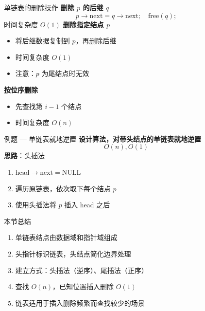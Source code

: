\documentclass[10pt, aspectratio=169]{beamer}
\begin{document}
\begin{frame}{单链表的删除操作}
    \textbf{删除 $p$ 的后继 $q$}
    \[
    p \to \text{next} = q \to \text{next};\quad \text{free}(q);
    \]
    时间复杂度 $O(1)$
    \vspace{0.5em}
    \textbf{删除指定结点 $p$}
    \begin{itemize}
        \item 将后继数据复制到 $p$，再删除后继
        \item 时间复杂度 $O(1)$
        \item 注意：$p$ 为尾结点时无效
    \end{itemize}
    \vspace{0.5em}
    \textbf{按位序删除}
    \begin{itemize}
        \item 先查找第 $i-1$ 个结点
        \item 时间复杂度 $O(n)$
    \end{itemize}
\end{frame}

\begin{frame}{例题 --- 单链表就地逆置}
    \textbf{设计算法，对带头结点的单链表就地逆置}
    \[
    O(n), O(1)
    \]
    \vspace{0.3em}
    \textbf{思路}：头插法
    \begin{enumerate}
        \item $\text{head} \to \text{next} = \text{NULL}$
        \item 遍历原链表，依次取下每个结点 $p$
        \item 使用头插法将 $p$ 插入 head 之后
    \end{enumerate}
\end{frame}

\begin{frame}{本节总结}
    \begin{enumerate}
        \item 单链表结点由数据域和指针域组成
        \item 头指针标识链表，头结点简化边界处理
        \item 建立方式：头插法（逆序）、尾插法（正序）
        \item 查找 $O(n)$，已知位置插入删除 $O(1)$
        \item 链表适用于插入删除频繁而查找较少的场景
    \end{enumerate}
\end{frame}
\end{document}
